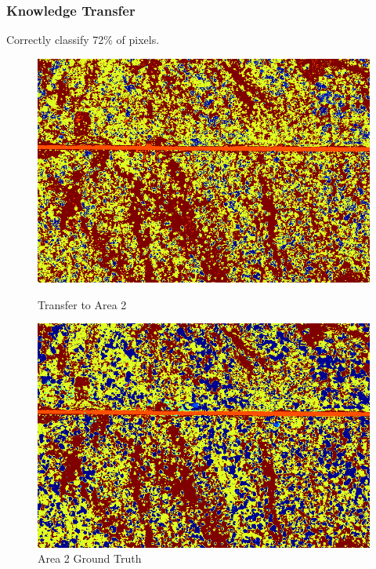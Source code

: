 \documentclass{beamer}
\begin{document}
\begin{frame}
  \frametitle{Knowledge Transfer}
  Correctly classify 72\% of pixels.
  \begin{figure}[ht]
    \centering
    \begin{minipage}[b]{0.48\linewidth}
      \centering
      \includegraphics[width=\textwidth]{./Images/EdurneAreas/Area1GraphTransferClassification.png}
      \caption{Transfer to Area 2}
    \end{minipage}
    \hfill
    \begin{minipage}[b]{0.48\linewidth}
      \centering
      \includegraphics[width=\textwidth]{./Images/EdurneAreas/Area1OriginalClassification.png}
      \caption{Area 2 Ground Truth}
    \end{minipage}
  \end{figure}
\end{frame}
\end{document}
